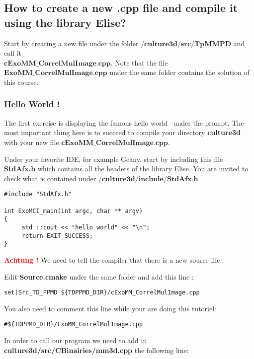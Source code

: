 \documentclass[a4paper]{book}
\begin{document}
\subsection{How to create a new .cpp file and compile it using the library Elise?}
Start by creating a new file under the folder $\textbf{/culture3d/src/TpMMPD}$ and call it \\$\textbf{cExoMM\_CorrelMulImage.cpp}$. Note that the file $\textbf{ExoMM\_CorrelMulImage.cpp}$ under the same folder contains the solution of this course.
\subsubsection{Hello World !}
The first exercise is displaying the famous \og hello world \fg\ under the prompt. The most important thing here is to succeed to compile your directory \textbf{culture3d} with your new file  $\textbf{cExoMM\_CorrelMulImage.cpp}$.\newline


Under your favorite IDE, for example Geany, start by including this file \textbf{StdAfx.h} which contains all the headers of the library Elise. You are invited to check what is contained under $\textbf{/culture3d/include/StdAfx.h}$ \newline

\begin{lstlisting}
#include "StdAfx.h"

int ExoMCI_main(int argc, char ** argv)
{
     std ::cout << "hello world" << "\n";
     return EXIT_SUCCESS;
}
\end{lstlisting}

\textbf{\textcolor{red}{Achtung !}} We need to tell the compiler that there is a new source file.

Edit \textbf{Source.cmake} under the same folder and add this line : \newline

\begin{lstlisting}
set(Src_TD_PPMD ${TDPPMD_DIR}/cExoMM_CorrelMulImage.cpp
\end{lstlisting}

You also need to comment this line while your are doing this tutoriel:
\begin{lstlisting}
#${TDPPMD_DIR}/ExoMM_CorrelMulImage.cpp
\end{lstlisting}

In order to call our program we need to add in \textbf{culture3d/src/CBinairies/mm3d.cpp} the following line: \newline
\end{document}

